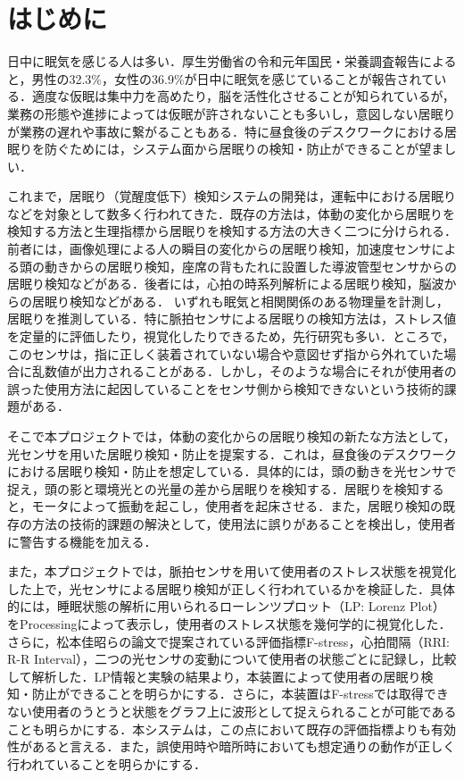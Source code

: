 \section{はじめに}

日中に眠気を感じる人は多い．厚生労働省の令和元年国民・栄養調査報告\cite{[1]}によると，男性の32.3\%，女性の36.9\%が日中に眠気を感じていることが報告されている．適度な仮眠は集中力を高めたり，脳を活性化させることが知られているが，業務の形態や進捗によっては仮眠が許されないことも多いし，意図しない居眠りが業務の遅れや事故に繋がることもある．特に昼食後のデスクワークにおける居眠りを防ぐためには，システム面から居眠りの検知・防止ができることが望ましい．

これまで，居眠り（覚醒度低下）検知システムの開発は，運転中における居眠りなどを対象として数多く行われてきた．既存の方法は，体動の変化から居眠りを検知する方法と生理指標から居眠りを検知する方法の大きく二つに分けられる．前者には，画像処理による人の瞬目の変化からの居眠り検知\cite{[2]}，加速度センサによる頭の動きからの居眠り検知\cite{[3]}，座席の背もたれに設置した導波管型センサからの居眠り検知\cite{[4]}などがある．後者には，心拍の時系列解析による居眠り検知\cite{[5]}，脳波からの居眠り検知\cite{[6]}などがある．
いずれも眠気と相関関係のある物理量を計測し，居眠りを推測している．特に脈拍センサによる居眠りの検知方法は，ストレス値を定量的に評価したり，視覚化したりできるため，先行研究も多い\cite{[5]}\cite{[7]}\cite{[9]}．ところで，このセンサは，指に正しく装着されていない場合や意図せず指から外れていた場合に乱数値が出力されることがある．しかし，そのような場合にそれが使用者の誤った使用方法に起因していることをセンサ側から検知できないという技術的課題がある．

そこで本プロジェクトでは，体動の変化からの居眠り検知の新たな方法として，光センサを用いた居眠り検知・防止を提案する．これは，昼食後のデスクワークにおける居眠り検知・防止を想定している．具体的には，頭の動きを光センサで捉え，頭の影と環境光との光量の差から居眠りを検知する．居眠りを検知すると，モータによって振動を起こし，使用者を起床させる．また，居眠り検知の既存の方法の技術的課題の解決として，使用法に誤りがあることを検出し，使用者に警告する機能を加える．

また，本プロジェクトでは，脈拍センサを用いて使用者のストレス状態を視覚化した上で，光センサによる居眠り検知が正しく行われているかを検証した．具体的には，睡眠状態の解析に用いられるローレンツプロット（LP: Lorenz Plot）\cite{[7]}\cite{[8]}をProcessingによって表示し，使用者のストレス状態を幾何学的に視覚化した．さらに，松本佳昭らの論文で提案されている評価指標F-stress\cite{[9]}，心拍間隔（RRI: R-R Interval），二つの光センサの変動について使用者の状態ごとに記録し，比較して解析した．LP情報と実験の結果より，本装置によって使用者の居眠り検知・防止ができることを明らかにする．さらに，本装置はF-stressでは取得できない使用者のうとうと状態をグラフ上に波形として捉えられることが可能であることも明らかにする．本システムは，この点において既存の評価指標よりも有効性があると言える．また，誤使用時や暗所時においても想定通りの動作が正しく行われていることを明らかにする．